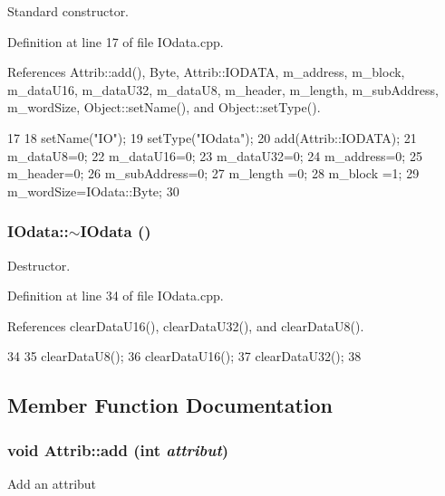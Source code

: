 Standard constructor. 

Definition at line 17 of file IOdata.cpp.

References Attrib::add(), Byte, Attrib::IODATA, m\_\-address, m\_\-block, m\_\-dataU16, m\_\-dataU32, m\_\-dataU8, m\_\-header, m\_\-length, m\_\-subAddress, m\_\-wordSize, Object::setName(), and Object::setType().


\begin{DoxyCode}
17                  {
18   setName("IO");
19   setType("IOdata");
20   add(Attrib::IODATA);
21   m_dataU8=0;
22   m_dataU16=0;
23   m_dataU32=0;
24   m_address=0;
25   m_header=0;
26   m_subAddress=0;
27   m_length =0;
28   m_block  =1;
29   m_wordSize=IOdata::Byte;
30 }
\end{DoxyCode}
\hypertarget{classIOdata_a3d7cf860040702b00a925703da7c0648}{
\subsubsection[{$\sim$IOdata}]{\setlength{\rightskip}{0pt plus 5cm}IOdata::$\sim$IOdata ()}}
\label{classIOdata_a3d7cf860040702b00a925703da7c0648}


Destructor. 

Definition at line 34 of file IOdata.cpp.

References clearDataU16(), clearDataU32(), and clearDataU8().


\begin{DoxyCode}
34                 {
35   clearDataU8();
36   clearDataU16();
37   clearDataU32();
38 }
\end{DoxyCode}


\subsection{Member Function Documentation}
\hypertarget{classAttrib_a235f773af19c900264a190b00a3b4ad7}{
\subsubsection[{add}]{\setlength{\rightskip}{0pt plus 5cm}void Attrib::add (int {\em attribut})}}
\label{classAttrib_a235f773af19c900264a190b00a3b4ad7}
Add an attribut 

